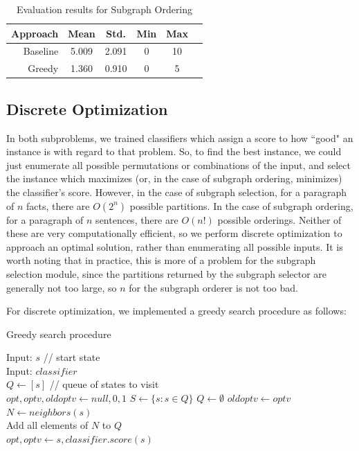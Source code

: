 \documentclass[12pt]{article}
\begin{document}
\begin{table}
\centering
\begin{tabular}{|r|c|c|c|c|c|}
\hline
Approach & Mean  & Std.  & Min & Max \\ \hline\hline
Baseline & 5.009 & 2.091 & 0   & 10  \\ \hline
Greedy   & 1.360 & 0.910 & 0   & 5   \\ \hline
\end{tabular}
\caption{Evaluation results for Subgraph Ordering}
\end{table}


\subsection{Discrete Optimization}

In both subproblems, we trained classifiers which assign a score to how ``good"
an instance is with regard to that problem. So, to find the best instance, we
could just enumerate all possible permutations or combinations of the input,
and select the instance which maximizes (or, in the case of subgraph ordering,
minimizes) the classifier's score. However, in the case of subgraph selection,
for a paragraph of $n$ facts, there are $O(2^n)$ possible partitions. In the
case of subgraph ordering, for a paragraph of $n$ sentences, there are $O(n!)$
possible orderings. Neither of these are very computationally efficient, so we
perform discrete optimization to approach an optimal solution, rather than
enumerating all possible inputs. It is worth noting that in practice, this is
more of a problem for the subgraph selection module, since the partitions
returned by the subgraph selector are generally not too large, so $n$ for the
subgraph orderer is not too bad.

For discrete optimization, we implemented a greedy search procedure as follows:
\begin{algorithm}
\caption{Greedy search procedure}
\label{greedy_search_alg}
\begin{algorithmic}
\STATE Input: $s$ // start state \\
\STATE Input: $classifier$ \\
\STATE $Q \gets [s]$ // queue of states to visit \\
\STATE $opt, optv, oldoptv \gets null, 0, 1$
    \STATE $S \gets \{s: s \in Q \}$
    \STATE $Q \gets \emptyset$
    \STATE $oldoptv \gets optv$
        \STATE $N \gets neighbors(s)$\\
        \STATE Add all elements of $N$ to $Q$\\
            \STATE $opt, optv \gets s, classifier.score(s)$\\
        \ENDIF
    \ENDFOR
\ENDWHILE
\end{algorithmic}
\end{algorithm}
\end{document}

